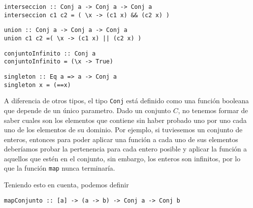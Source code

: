 \begin{centrado}
    \begin{verbatim}
interseccion :: Conj a -> Conj a -> Conj a
interseccion c1 c2 = ( \x -> (c1 x) && (c2 x) )
    \end{verbatim}
\end{centrado}

\begin{centrado}
    \begin{verbatim}
union :: Conj a -> Conj a -> Conj a
union c1 c2 =( \x -> (c1 x) || (c2 x) )
 \end{verbatim}
\end{centrado}

\begin{centrado}
    \begin{verbatim}
conjuntoInfinito :: Conj a
conjuntoInfinito = (\x -> True)
    \end{verbatim}
\end{centrado}

\begin{centrado}
    \begin{verbatim}
singleton :: Eq a => a -> Conj a
singleton x = (==x)
    \end{verbatim}
\end{centrado}

A diferencia de otros tipos, el tipo \texttt{Conj} está definido como una función booleana que depende de un único parametro. Dado un conjunto $C$, no tenemos formar de saber cuales son los elementos que contiene sin haber probado uno por uno cada uno de los elementos de su dominio. Por ejemplo, si tuviesemos un conjunto de enteros, entonces para poder aplicar una función a cada uno de sus elementos deberíamos probar la pertenencia para cada entero posible y aplicar la función a aquellos que estén en el conjunto, sin embargo, los enteros son infinitos, por lo que la función \texttt{map} nunca terminaría.

Teniendo esto en cuenta, podemos definir
\begin{centrado}
\begin{verbatim}
mapConjunto :: [a] -> (a -> b) -> Conj a -> Conj b
\end{verbatim}
\end{centrado}

